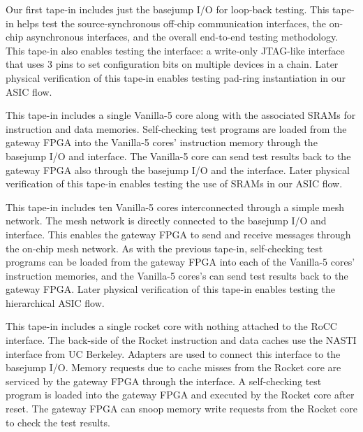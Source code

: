 \smallskip
\begin{cbxlist}{1.5em}{0em}{0.5em}
  \raggedright

  \item {} Our first tape-in includes just the basejump
     I/O for loop-back testing. This tape-in helps test the
     source-synchronous off-chip communication interfaces, the on-chip
     asynchronous interfaces, and the overall end-to-end testing
     methodology. This tape-in also enables testing the 
     interface: a write-only JTAG-like interface that uses 3 pins to set
     configuration bits on multiple devices in a chain. Later physical
     verification of this tape-in enables testing pad-ring instantiation
     in our ASIC flow.

  \item {} This tape-in
     includes a single Vanilla-5 core along with the associated SRAMs for
     instruction and data memories. Self-checking test programs are
     loaded from the gateway FPGA into the Vanilla-5 cores' instruction
     memory through the basejump I/O and  interface. The
     Vanilla-5 core can send test results back to the gateway FPGA also
     through the basejump I/O and the  interface. Later
     physical verification of this tape-in enables testing the use of
     SRAMs in our ASIC flow.

  \item {} This tape-in includes
     ten Vanilla-5 cores interconnected through a simple mesh network.
     The mesh network is directly connected to the basejump I/O and
      interface. This enables the gateway FPGA to send and
     receive messages through the on-chip mesh network. As with the
     previous tape-in, self-checking test programs can be loaded from the
     gateway FPGA into each of the Vanilla-5 cores' instruction memories,
     and the Vanilla-5 cores's can send test results back to the gateway
     FPGA. Later physical verification of this tape-in enables testing
     the hierarchical ASIC flow.

  \item {} This tape-in includes
     a single rocket core with nothing attached to the RoCC interface.
     The back-side of the Rocket instruction and data caches use the
     NASTI interface from UC Berkeley. Adapters are used to connect this
     interface to the basejump I/O. Memory requests due to cache misses
     from the Rocket core are serviced by the gateway FPGA through the
      interface. A self-checking test program is loaded
     into the gateway FPGA and executed by the Rocket core after reset.
     The gateway FPGA can snoop memory write requests from the Rocket
     core to check the test results.


\end{cbxlist}
